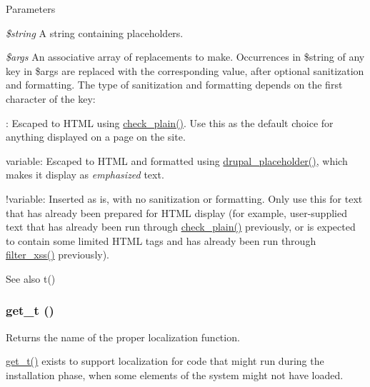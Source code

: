 \begin{DoxyParams}{Parameters}
\item[{\em \$string}]A string containing placeholders. \item[{\em \$args}]An associative array of replacements to make. Occurrences in \$string of any key in \$args are replaced with the corresponding value, after optional sanitization and formatting. The type of sanitization and formatting depends on the first character of the key:
\begin{DoxyItemize}
\item : Escaped to HTML using \hyperlink{group__sanitization_ga76fc67a30fd8d75ddd80565e6e65a13d}{check\_\-plain()}. Use this as the default choice for anything displayed on a page on the site.
\item variable: Escaped to HTML and formatted using \hyperlink{group__schemaapi_ga4ab49ad51d8b93bb296a8492296d655b}{drupal\_\-placeholder()}, which makes it display as {\itshape emphasized\/} text.
\item !variable: Inserted as is, with no sanitization or formatting. Only use this for text that has already been prepared for HTML display (for example, user-\/supplied text that has already been run through \hyperlink{group__sanitization_ga76fc67a30fd8d75ddd80565e6e65a13d}{check\_\-plain()} previously, or is expected to contain some limited HTML tags and has already been run through \hyperlink{group__sanitization_ga8864a29ffa8de5c9f8dc9e417060660d}{filter\_\-xss()} previously).
\end{DoxyItemize}\end{DoxyParams}
\begin{DoxySeeAlso}{See also}
t() 
\end{DoxySeeAlso}
\hypertarget{group__sanitization_gaa50232f577883a48731fc93530628a79}{
\subsubsection[{get\_\-t}]{\setlength{\rightskip}{0pt plus 5cm}get\_\-t ()}}
\label{group__sanitization_gaa50232f577883a48731fc93530628a79}
Returns the name of the proper localization function.

\hyperlink{group__sanitization_gaa50232f577883a48731fc93530628a79}{get\_\-t()} exists to support localization for code that might run during the installation phase, when some elements of the system might not have loaded.

